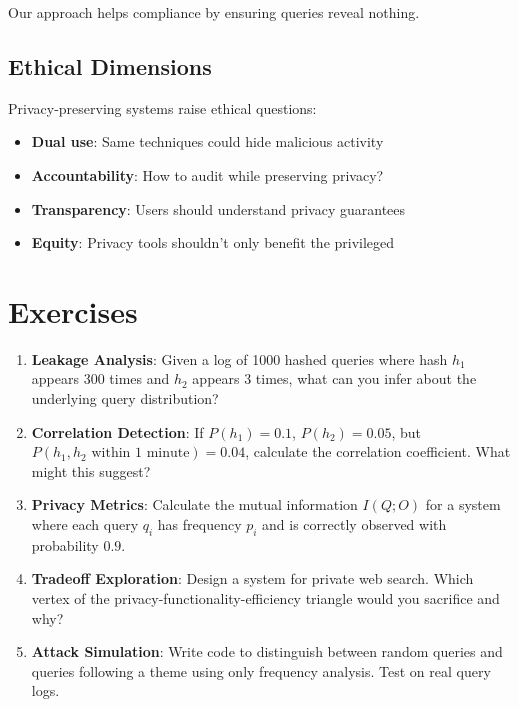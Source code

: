 Our approach helps compliance by ensuring queries reveal nothing.

\subsection{Ethical Dimensions}

Privacy-preserving systems raise ethical questions:
\begin{itemize}
\item \textbf{Dual use}: Same techniques could hide malicious activity
\item \textbf{Accountability}: How to audit while preserving privacy?
\item \textbf{Transparency}: Users should understand privacy guarantees
\item \textbf{Equity}: Privacy tools shouldn't only benefit the privileged
\end{itemize}

\section{Exercises}

\begin{enumerate}
\item \textbf{Leakage Analysis}: Given a log of 1000 hashed queries where hash $h_1$ appears 300 times and $h_2$ appears 3 times, what can you infer about the underlying query distribution?

\item \textbf{Correlation Detection}: If $P(h_1) = 0.1$, $P(h_2) = 0.05$, but $P(h_1, h_2 \text{ within 1 minute}) = 0.04$, calculate the correlation coefficient. What might this suggest?

\item \textbf{Privacy Metrics}: Calculate the mutual information $I(Q; O)$ for a system where each query $q_i$ has frequency $p_i$ and is correctly observed with probability $0.9$.

\item \textbf{Tradeoff Exploration}: Design a system for private web search. Which vertex of the privacy-functionality-efficiency triangle would you sacrifice and why?

\item \textbf{Attack Simulation}: Write code to distinguish between random queries and queries following a theme using only frequency analysis. Test on real query logs.
\end{enumerate}

